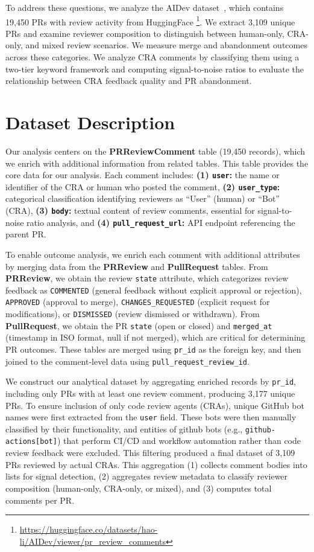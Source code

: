 \documentclass[sigconf]{acmart}
\begin{document}
To address these questions, we analyze the AIDev dataset~\cite{Li_2025_SE3}, which contains 19,450 PRs with review activity from HuggingFace \footnote{\url{https://huggingface.co/datasets/hao-li/AIDev/viewer/pr_review_comments}}. We extract 3,109 unique PRs and examine reviewer composition to distinguish between human-only, CRA-only, and mixed review scenarios. We measure merge and abandonment outcomes across these categories. We analyze CRA comments by classifying them using a two-tier keyword framework and computing signal-to-noise ratios to evaluate the relationship between CRA feedback quality and PR abandonment.


\section{Dataset Description}

Our analysis centers on the \textbf{PRReviewComment} table (19,450 records), which we enrich with additional information from related tables. This table provides the core data for our analysis. Each comment includes: \textbf{(1) \texttt{user}:} the name or identifier of the CRA or human who posted the comment, \textbf{(2) \texttt{user\_type}:} categorical classification identifying reviewers as ``User'' (human) or ``Bot'' (CRA), \textbf{(3) \texttt{body}:} textual content of review comments, essential for signal-to-noise ratio analysis, and \textbf{(4) \texttt{pull\_request\_url}:} API endpoint referencing the parent PR.

To enable outcome analysis, we enrich each comment with additional attributes by merging data from the \textbf{PRReview} and \textbf{PullRequest} tables. From \textbf{PRReview}, we obtain the review \texttt{state} attribute, which categorizes review feedback as \texttt{COMMENTED} (general feedback without explicit approval or rejection), \texttt{APPROVED} (approval to merge), \texttt{CHANGES\_REQUESTED} (explicit request for modifications), or \texttt{DISMISSED} (review dismissed or withdrawn). From \textbf{PullRequest}, we obtain the PR \texttt{state} (open or closed) and \texttt{merged\_at} (timestamp in ISO format, null if not merged), which are critical for determining PR outcomes. These tables are merged using \texttt{pr\_id} as the foreign key, and then joined to the comment-level data using \texttt{pull\_request\_review\_id}.

We construct our analytical dataset by aggregating enriched records by \texttt{pr\_id}, including only PRs with at least one review comment, producing 3,177 unique PRs. To ensure inclusion of only code review agents (CRAs), unique GitHub bot names were first extracted from the \texttt{user} field. These bots were then manually classified by their functionality, and entities of github bots (e.g., \texttt{github-actions[bot]}) that perform CI/CD and workflow automation rather than code review feedback were excluded. This filtering produced a final dataset of 3,109 PRs reviewed by actual CRAs. This aggregation (1) collects comment bodies into lists for signal detection, (2) aggregates review metadata to classify reviewer composition (human-only, CRA-only, or mixed), and (3) computes total comments per PR.
\end{document}
